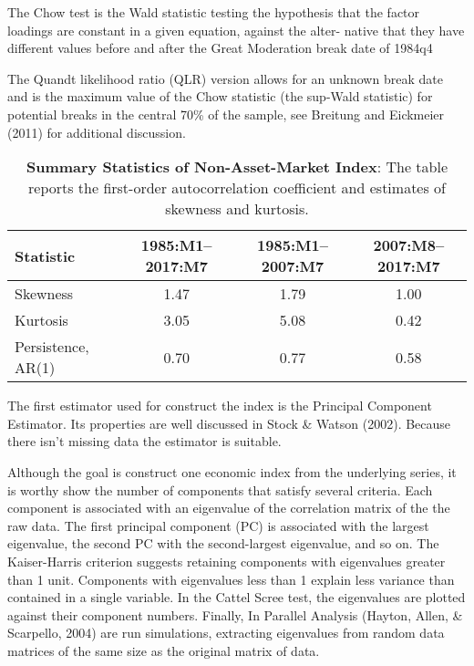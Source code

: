\documentclass[12pt,twoside]{reedthesis}
\begin{document}
The Chow test is the Wald statistic testing
the hypothesis that the factor loadings are constant in a given equation, against the alter-
native that they have different values before and after the Great Moderation break date of
1984q4

The Quandt
likelihood ratio (QLR) version allows for an unknown break date and is the maximum
value of the Chow statistic (the sup-Wald statistic) for potential breaks in the central
70\% of the sample, see Breitung and Eickmeier (2011) for additional discussion.


\begin{table}

\caption[Summary Statistics of Non-Asset-Market Index]{\label{tab:summary-table}\textbf{Summary Statistics of Non-Asset-Market Index}: The table reports the first-order autocorrelation coefficient and estimates of skewness and kurtosis.}
\centering
\begin{tabular}[t]{lccc}
\toprule
Statistic & 1985:M1--2017:M7 & 1985:M1--2007:M7 & 2007:M8--2017:M7\\
\midrule
Skewness & 1.47 & 1.79 & 1.00\\
Kurtosis & 3.05 & 5.08 & 0.42\\
Persistence, AR(1) & 0.70 & 0.77 & 0.58\\
\bottomrule
\end{tabular}
\end{table}
The first estimator used for construct the index is the Principal Component Estimator. Its properties are well discussed in Stock \& Watson (2002). Because there isn't missing data the estimator is suitable.

Although the goal is construct one economic index from the underlying series, it is worthy show the number of components that satisfy several criteria. Each component is associated with an eigenvalue of the correlation matrix of the the raw data. The first principal component (PC) is associated with the largest eigenvalue, the second PC with the second-largest eigenvalue, and so on. The Kaiser-Harris criterion suggests retaining components with eigenvalues greater than 1 unit. Components with eigenvalues less than 1 explain less variance than contained in a single variable. In the Cattel Scree test, the eigenvalues are plotted against their component numbers. Finally, In Parallel Analysis (Hayton, Allen, \& Scarpello, 2004) are run simulations, extracting eigenvalues from random data matrices of the same size as the original matrix of data.
\end{document}
